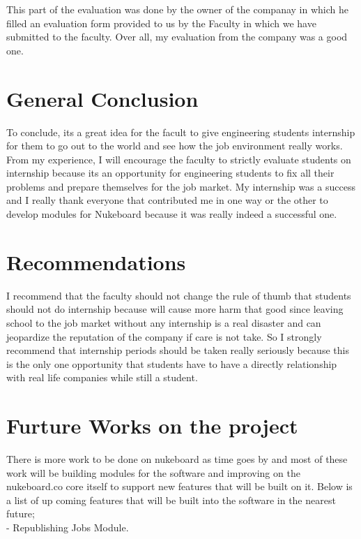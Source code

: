 This part of the evaluation was done by the owner of the companay in which he filled an evaluation form provided to us by the Faculty in which we have submitted to the faculty. Over all, my evaluation from the company was a good one.

\section{General Conclusion}

To conclude, its a great idea for the facult to give engineering students internship for them to go out to the world and see how the job environment really works. From my experience, I will encourage the faculty to strictly evaluate students on internship because its an opportunity for engineering students to fix all their problems and prepare themselves for the job market. My internship was a success and I really thank everyone that contributed me in one way or the other to develop modules for Nukeboard because it was really indeed a successful one.

\section{Recommendations}

I recommend that the faculty should not change the rule of thumb that students should not do internship because will cause more harm that good since leaving school to the job market without any internship is a real disaster and can jeopardize the reputation of the company if care is not take. So I strongly recommend that internship periods should be taken really seriously because this is the only one opportunity that students have to have a directly relationship with real life companies while still a student.

\section{Furture Works on the project}

There is more work to be done on nukeboard as time goes by and most of these work will be building modules for the software and improving on the nukeboard.co core itself to support new features that will be built on it. Below is a list of up coming features that will be built into the software in the nearest future;\\

- Republishing Jobs Module. \\

